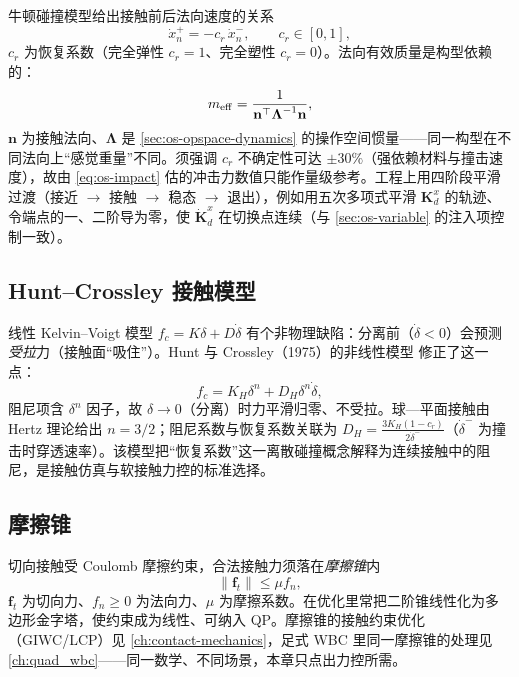 牛顿碰撞模型给出接触前后法向速度的关系
\begin{equation}
  \dot x_n^+=-c_r\,\dot x_n^-,\qquad c_r\in[0,1],
  \label{eq:os-newton}
\end{equation}
$c_r$ 为恢复系数（完全弹性 $c_r=1$、完全塑性 $c_r=0$）。法向有效质量是构型依赖的：
\begin{equation}
  m_{\rm eff}=\frac{1}{\mathbf n^\top\boldsymbol\Lambda^{-1}\mathbf n},
  \label{eq:os-meff}
\end{equation}
$\mathbf n$ 为接触法向、$\boldsymbol\Lambda$ 是 \cref{sec:os-opspace-dynamics} 的操作空间惯量——同一构型在不同法向上“感觉重量”不同。须强调 $c_r$ 不确定性可达 $\pm30\%$（强依赖材料与撞击速度），故由 \cref{eq:os-impact} 估的冲击力数值只能作量级参考。工程上用四阶段平滑过渡（接近 $\to$ 接触 $\to$ 稳态 $\to$ 退出），例如用五次多项式平滑 $\mathbf K_d^x$ 的轨迹、令端点的一、二阶导为零，使 $\dot{\mathbf K}_d^x$ 在切换点连续（与 \cref{sec:os-variable} 的注入项控制一致）。

\subsection{Hunt--Crossley 接触模型}
\label{sec:os-hunt-crossley}

线性 Kelvin--Voigt 模型 $f_c=K\delta+D\dot\delta$ 有个非物理缺陷：分离前（$\dot\delta<0$）会预测\emph{受拉}力（接触面“吸住”）。Hunt 与 Crossley（1975）的非线性模型\cite{hunt1975coefficient} 修正了这一点：
\begin{equation}
  f_c=K_H\delta^n+D_H\delta^n\dot\delta,
  \label{eq:os-hunt-crossley}
\end{equation}
阻尼项含 $\delta^n$ 因子，故 $\delta\to0$（分离）时力平滑归零、不受拉。球—平面接触由 Hertz 理论给出 $n=3/2$；阻尼系数与恢复系数关联为 $D_H=\tfrac{3K_H(1-c_r)}{2\dot\delta^-}$（$\dot\delta^-$ 为撞击时穿透速率）。该模型把“恢复系数”这一离散碰撞概念解释为连续接触中的阻尼，是接触仿真与软接触力控的标准选择。

\subsection{摩擦锥}
\label{sec:os-friction}

切向接触受 Coulomb 摩擦约束，合法接触力须落在\emph{摩擦锥}内
\begin{equation}
  \|\mathbf f_t\|\le\mu f_n,
  \label{eq:os-friction-cone}
\end{equation}
$\mathbf f_t$ 为切向力、$f_n\ge0$ 为法向力、$\mu$ 为摩擦系数。在优化里常把二阶锥线性化为多边形金字塔，使约束成为线性、可纳入 QP。摩擦锥的接触约束优化（GIWC/LCP）见 \cref{ch:contact-mechanics}，足式 WBC 里同一摩擦锥的处理见 \cref{ch:quad_wbc}——同一数学、不同场景，本章只点出力控所需。

